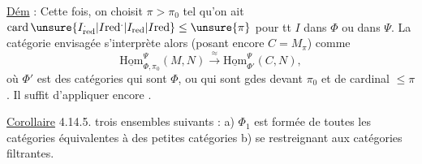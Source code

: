\uline{Dém} : Cette fois, on choisit $\pi>\pi_0$ tel qu'on ait $\operatorname{card}\unsure{I_{\mathrm{red}}^{.}|I\mathrm{red}^{.}|I_{\mathrm{red}}|I\mathrm{red}}\leq\unsure{\pi}$ pour tt $I$ dans $\Phi$ ou dans $\Psi$. La catégorie envisagée s'interprète alors (posant encore $C=M_{\pi}$) comme 
\[
\underline{\mathrm{Hom}}_{\Phi,\pi_0}^{\Psi}(M,N)\xrightarrow{\approx}
\underline{\mathrm{Hom}}_{\Phi'}^{\Psi}(C,N),
\]
où $\Phi'$ est  des catégories qui sont  $\Phi$, ou qui sont gdes devant $\pi_0$ et de cardinal $\leq\pi$. Il suffit  d'appliquer encore .

\uline{Corollaire} 4.14.5.   trois ensembles suivants : a) $\Phi_1$ est formée de toutes les catégories \unsure{*} équivalentes à des petites catégories \quad b)   se restreignant aux catégories filtrantes.


